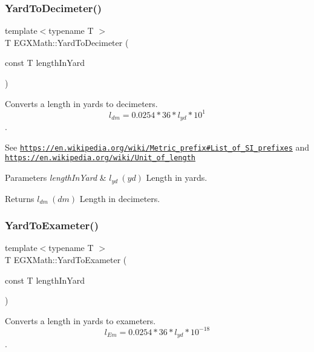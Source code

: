 \subsubsection{\texorpdfstring{Yard\+To\+Decimeter()}{YardToDecimeter()}}
{\footnotesize\ttfamily template$<$typename T $>$ \\
T E\+G\+X\+Math\+::\+Yard\+To\+Decimeter (\begin{DoxyParamCaption}\item[{const T}]{length\+In\+Yard }\end{DoxyParamCaption})}



Converts a length in yards to decimeters. \[ l_{dm}=0.0254 * 36 * l_{yd} * 10^{1} \]. 

See \href{https://en.wikipedia.org/wiki/Metric_prefix#List_of_SI_prefixes}{\tt https\+://en.\+wikipedia.\+org/wiki/\+Metric\+\_\+prefix\#\+List\+\_\+of\+\_\+\+S\+I\+\_\+prefixes} and \href{https://en.wikipedia.org/wiki/Unit_of_length}{\tt https\+://en.\+wikipedia.\+org/wiki/\+Unit\+\_\+of\+\_\+length} 
\begin{DoxyParams}{Parameters}
{\em length\+In\+Yard} & $ l_{yd}\ (yd)$ Length in yards. \\
\hline
\end{DoxyParams}
\begin{DoxyReturn}{Returns}
$ l_{dm}\ (dm)$ Length in decimeters. 
\end{DoxyReturn}
\mbox{\label{group___e_g_x_math-_conversions-_length_conversions-_imperial-_yard-_s_i_ga4a7094ebfbac7caa8c6b4eb0f695e57a}} 
\subsubsection{\texorpdfstring{Yard\+To\+Exameter()}{YardToExameter()}}
{\footnotesize\ttfamily template$<$typename T $>$ \\
T E\+G\+X\+Math\+::\+Yard\+To\+Exameter (\begin{DoxyParamCaption}\item[{const T}]{length\+In\+Yard }\end{DoxyParamCaption})}



Converts a length in yards to exameters. \[ l_{Em}=0.0254 * 36 * l_{yd} * 10^{-18} \]. 

